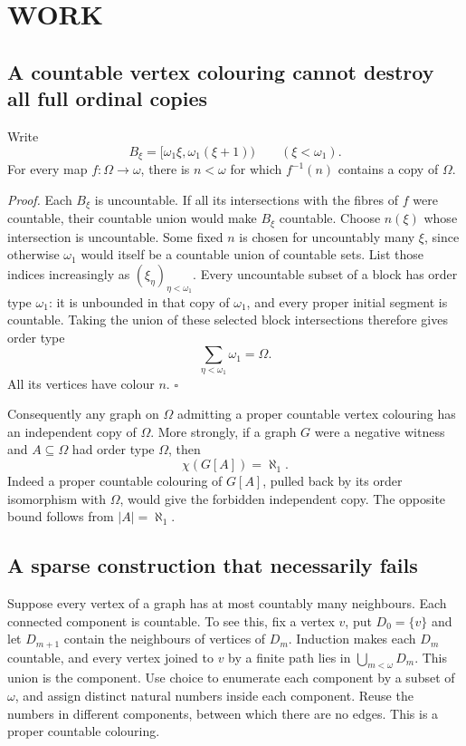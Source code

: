 \section{WORK}
\subsection{A countable vertex colouring cannot destroy all full ordinal copies}
Write
\[
B_\xi=[\omega_1\xi,\omega_1(\xi+1))\qquad(\xi<\omega_1).
\]
For every map $f:\Omega\to\omega$, there is $n<\omega$ for which $f^{-1}(n)$ contains a copy of $\Omega$.

\textit{Proof.} Each $B_\xi$ is uncountable. If all its intersections with the fibres of $f$ were countable, their countable union would make $B_\xi$ countable. Choose $n(\xi)$ whose intersection is uncountable. Some fixed $n$ is chosen for uncountably many $\xi$, since otherwise $\omega_1$ would itself be a countable union of countable sets. List those indices increasingly as $(\xi_\eta)_{\eta<\omega_1}$. Every uncountable subset of a block has order type $\omega_1$: it is unbounded in that copy of $\omega_1$, and every proper initial segment is countable. Taking the union of these selected block intersections therefore gives order type
\[
\sum_{\eta<\omega_1}\omega_1=\Omega.
\]
All its vertices have colour $n$. \hfill$\square$

Consequently any graph on $\Omega$ admitting a proper countable vertex colouring has an independent copy of $\Omega$. More strongly, if a graph $G$ were a negative witness and $A\subseteq\Omega$ had order type $\Omega$, then
\[
\chi(G[A])=\aleph_1.
\]
Indeed a proper countable colouring of $G[A]$, pulled back by its order isomorphism with $\Omega$, would give the forbidden independent copy. The opposite bound follows from $|A|=\aleph_1$.

\subsection{A sparse construction that necessarily fails}
Suppose every vertex of a graph has at most countably many neighbours. Each connected component is countable. To see this, fix a vertex $v$, put $D_0=\{v\}$ and let $D_{m+1}$ contain the neighbours of vertices of $D_m$. Induction makes each $D_m$ countable, and every vertex joined to $v$ by a finite path lies in $\bigcup_{m<\omega}D_m$. This union is the component. Use choice to enumerate each component by a subset of $\omega$, and assign distinct natural numbers inside each component. Reuse the numbers in different components, between which there are no edges. This is a proper countable colouring.

